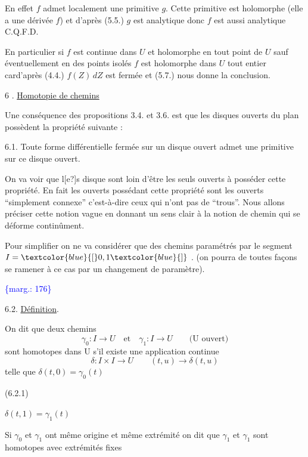 \documentclass[11pt]{article}
\newcommand{\scanpage}[1]{\par\bigskip\noindent{\small\sffamily[scan #1]}\par}
\newcommand{\mspage}[1]{{\small\sffamily[p.\,#1]}}
\newcommand{\hand}[1]{\textcolor{blue}{#1}}
\newcommand{\margin}[1]{\textcolor{blue}{\{\textsf{marg.:} #1\}}}
\newcommand{\uline}[1]{\underline{#1}}
\newcommand{\unsure}[1]{[#1?]}
\begin{document}
En effet $f$ admet localement une primitive $g$. Cette primitive est
holomorphe (elle a une dérivée $f$) et d'après (5.5.) $g$ est analytique donc
$f$ est aussi analytique C.Q.F.D.

En particulier si $f$ est continue dans $U$ et holomorphe en tout point de $U$
sauf éventuellement en des points isolés $f$ est holomorphe dans $U$ tout
entier card'après (4.4.) $f(Z)\,dZ$ est fermée et (5.7.) nous donne la
conclusion.

6 . \uline{Homotopie de chemins}

Une conséquence des propositions 3.4. et 3.6. est que les disques
ouverts du plan possèdent la propriété suivante :

6.1. Toute forme différentielle fermée sur un disque ouvert admet une
primitive sur ce disque ouvert.

On va voir que l\unsure{e}s disque sont loin d'être les seuls ouverts à posséder cette
propriété. En fait les ouverts possédant cette propriété sont les ouverts
``simplement connexe'' c'est-à-dire ceux qui n'ont pas de ``trous''. Nous allons
préciser cette notion vague en donnant un sens clair à la notion de chemin qui
se déforme continûment.

Pour simplifier on ne va considérer que des chemins paramétrés par le segment
$I = \hand{[}0,1\hand{]}$ . (on pourra de toutes façons se ramener à ce cas par un changement
de paramètre).

\margin{176}

\clearpage
\scanpage{119/177}
\mspage{- 16 -}

6.2. \uline{Définition}.

On dit que deux chemins
\[ \gamma_0 : I \to U \quad \text{et} \quad \gamma_1 : I \to U \qquad \text{(U ouvert)} \]
sont homotopes dans U s'il existe une application continue
\[ \delta : I \times I \to U \qquad (t,u) \to \delta(t,u) \]
telle que \qquad $\delta(t,0) = \gamma_0(t)$

(6.2.1)

\qquad\qquad $\delta(t,1) = \gamma_1(t)$

Si $\gamma_0$ et $\gamma_1$ ont même origine et même extrémité on dit que $\gamma_1$ et $\gamma_1$
sont homotopes avec extrémités fixes
\end{document}

